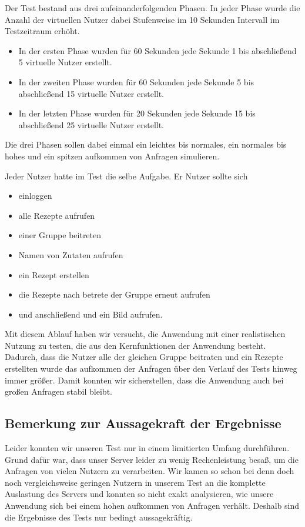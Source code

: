 \documentclass{qualitätssicherungsheft}
\begin{document}
Der Test bestand aus drei aufeinanderfolgenden Phasen.
In jeder Phase wurde die Anzahl der virtuellen Nutzer dabei Stufenweise im 10 Sekunden Intervall im Testzeitraum erhöht.
\begin{itemize}
    \item In der ersten Phase wurden für 60 Sekunden jede Sekunde 1 bis abschließend 5 virtuelle Nutzer erstellt.
    \item In der zweiten Phase wurden für 60 Sekunden jede Sekunde 5 bis abschließend 15 virtuelle Nutzer erstellt.
    \item In der letzten Phase wurden für 20 Sekunden jede Sekunde 15 bis abschließend 25 virtuelle Nutzer erstellt.
\end{itemize}

Die drei Phasen sollen dabei einmal ein leichtes bis normales, ein normales bis hohes und ein spitzen aufkommen von Anfragen simulieren.

Jeder Nutzer hatte im Test die selbe Aufgabe.
Er Nutzer sollte sich
\begin{itemize}
    \item einloggen
    \item alle Rezepte aufrufen
    \item einer Gruppe beitreten
    \item Namen von Zutaten aufrufen
    \item ein Rezept erstellen
    \item die Rezepte nach betrete der Gruppe erneut aufrufen
    \item und anschließend  und ein Bild aufrufen.
\end{itemize}
Mit diesem Ablauf haben wir versucht, die Anwendung mit einer realistischen Nutzung zu testen, die aus den Kernfunktionen der Anwendung besteht.
Dadurch, dass die Nutzer alle der gleichen Gruppe beitraten und ein Rezepte erstellten wurde das aufkommen der Anfragen über den Verlauf des Tests hinweg immer größer.
Damit konnten wir sicherstellen, dass die Anwendung auch bei großen Anfragen stabil bleibt.

\subsection{Bemerkung zur Aussagekraft der Ergebnisse}
Leider konnten wir unseren Test nur in einem limitierten Umfang durchführen.
Grund dafür war, dass unser Server leider zu wenig Rechenleistung besaß, um die Anfragen von vielen Nutzern zu verarbeiten.
Wir kamen so schon bei denn doch noch vergleichsweise geringen Nutzern in unserem Test an die komplette Auslastung des Servers und konnten so nicht exakt analysieren, wie unsere Anwendung sich bei einem hohen aufkommen von Anfragen verhält.
Deshalb sind die Ergebnisse des Tests nur bedingt aussagekräftig.
\end{document}
